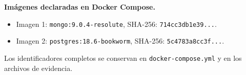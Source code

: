 \noindent\textbf{Imágenes declaradas en Docker Compose.}

\begin{itemize}
\item Imagen 1: \texttt{mongo:9.0.4-resolute}, SHA-256: \texttt{714cc3db1e39...}.
\item Imagen 2: \texttt{postgres:18.6-bookworm}, SHA-256: \texttt{5c4783a8cc3f...}.
\end{itemize}

\noindent Los identificadores completos se conservan en \texttt{docker-compose.yml} y en los archivos de evidencia.
